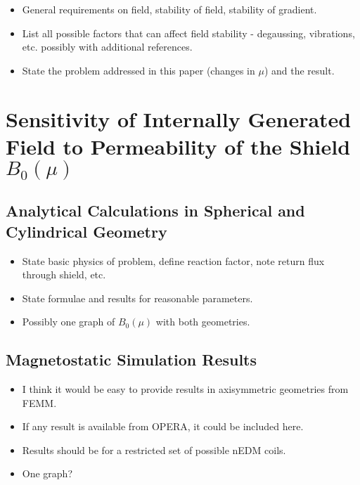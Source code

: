 \documentclass[review]{elsarticle}
\begin{document}
\begin{itemize}
\item General requirements on field, stability of field, stability of gradient.
\item List all possible factors that can affect field stability -
  degaussing, vibrations, etc. possibly with additional references.
\item State the problem addressed in this paper (changes in $\mu$) and
  the result.
\end{itemize}


\section{Sensitivity of Internally Generated Field to Permeability of the Shield $B_0(\mu)$}

\subsection{Analytical Calculations in Spherical and Cylindrical Geometry}

\begin{itemize}
\item State basic physics of problem, define reaction factor, note
  return flux through shield, etc.
\item State formulae and results for reasonable parameters.
\item Possibly one graph of $B_0(\mu)$ with both geometries.
\end{itemize}

\subsection{Magnetostatic Simulation Results}

\begin{itemize}
\item I think it would be easy to provide results in axisymmetric
  geometries from FEMM.
\item If any result is available from OPERA, it could be included here.
\item Results should be for a restricted set of possible nEDM coils.
\item One graph?  %
\end{itemize}
\end{document}
